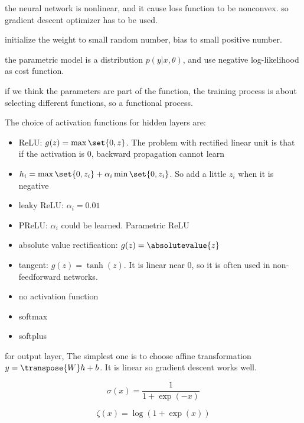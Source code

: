 the neural network is nonlinear, and it cause loss function to be nonconvex. so gradient descent optimizer has to be used.

initialize the weight to small random number, bias to small positive number.

the parametric model is a distribution $p(y|x,\theta)$, and use negative log-likelihood as cost function.

if we think the parameters are part of the function, the training process is about selecting different functions, so a functional process.



The choice of activation functions for hidden layers are:
\begin{itemize}
    \item ReLU: $g(z) = \max \set{0, z}$. The problem with rectified linear unit is that if the activation is $0$, backward propagation cannot learn
    \item $h_i = \max\set{0,z_i} + \alpha_i \min\set{0,z_i}$. So add a little $z_i$ when it is negative
    \item leaky ReLU: $\alpha_i = 0.01$
    \item PReLU: $\alpha_i$ could be learned. Parametric ReLU
    \item absolute value rectification: $g(z) = \absolutevalue{z}$
    \item tangent: $g(z) = \tanh(z)$. It is linear near $0$, so it is often used in non-feedforward networks.
    \item no activation function
    \item softmax
    \item softplus
\end{itemize}



for output layer, The simplest one is to choose affine transformation $y = \transpose{W} h + b$. It is linear so gradient descent works well.

\begin{definition}
    \begin{equation}
        \sigma(x) = \frac{1}{1 + \exp(-x)}    
    \end{equation}    
\end{definition}

\begin{definition}[softplus]
    \begin{equation}
        \zeta(x) = \log (1 + \exp(x))
    \end{equation}    
\end{definition}


